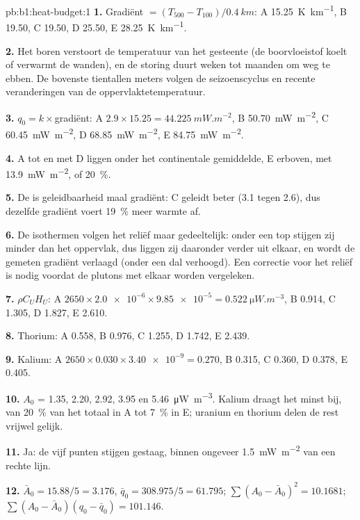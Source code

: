 \begin{solution}{pb:b1:heat-budget:1}
\textbf{1.} Gradiënt $= (T_{500} - T_{100})/\qty{0.4}{km}$: A \qty{15.25}{K.km^{-1}},
B \num{19.50}, C \num{19.50}, D \num{25.50}, E \qty{28.25}{K.km^{-1}}.

\textbf{2.} Het boren verstoort de temperatuur van het gesteente (de boorvloeistof koelt of verwarmt de wanden), en de storing duurt weken tot maanden om weg te ebben. De bovenste tientallen meters volgen de seizoenscyclus en recente veranderingen van de oppervlaktetemperatuur.

\textbf{3.} $q_0 = k\times$gradiënt: A $2.9\times15.25 = \qty{44.225}{mW.m^{-2}}$,
B \qty{50.70}{mW.m^{-2}}, C \qty{60.45}{mW.m^{-2}}, D \qty{68.85}{mW.m^{-2}},
E \qty{84.75}{mW.m^{-2}}.

\textbf{4.} A tot en met D liggen onder het continentale gemiddelde, E erboven, met
\qty{13.9}{mW.m^{-2}}, of \qty{20}{\percent}.

\textbf{5.} De  is geleidbaarheid maal gradiënt: C geleidt beter (3.1
tegen 2.6), dus dezelfde gradiënt voert \qty{19}{\percent} meer warmte af.

\textbf{6.} De isothermen volgen het reliëf maar gedeeltelijk: onder een top stijgen zij minder dan het oppervlak, dus liggen zij daaronder verder uit elkaar, en wordt de gemeten gradiënt verlaagd (onder een dal verhoogd). Een correctie voor het reliëf is nodig voordat de plutons met elkaar worden vergeleken.

\textbf{7.} $\rho C_U H_U$: A $2650\times\num{2.0e-6}\times\num{9.85e-5} =
\qty{0.522}{\micro W.m^{-3}}$, B 0.914, C 1.305, D 1.827, E 2.610.

\textbf{8.} Thorium: A 0.558, B 0.976, C 1.255, D 1.742, E 2.439.

\textbf{9.} Kalium: A $2650\times0.030\times\num{3.40e-9} = 0.270$, B 0.315,
C 0.360, D 0.378, E 0.405.

\textbf{10.} $A_0$ = 1.35, 2.20, 2.92, 3.95 en \qty{5.46}{\micro W.m^{-3}}.
Kalium draagt het minst bij, van \qty{20}{\percent} van het totaal in A tot
\qty{7}{\percent} in E; uranium en thorium delen de rest vrijwel gelijk.

\textbf{11.} Ja: de vijf punten stijgen gestaag, binnen ongeveer
\qty{1.5}{mW.m^{-2}} van een rechte lijn.

\textbf{12.} $\bar A_0 = 15.88/5 = 3.176$, $\bar q_0 = 308.975/5 = 61.795$;
$\sum(A_0 - \bar A_0)^2 = 10.1681$; $\sum(A_0 - \bar A_0)(q_0 - \bar q_0) =
101.146$.


\end{solution}
